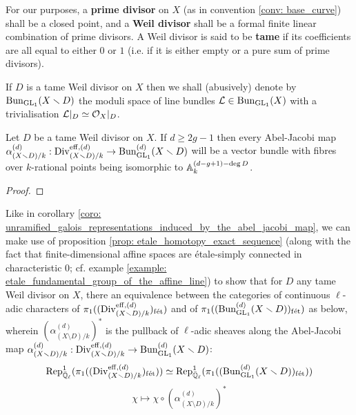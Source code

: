         \begin{definition} \label{def: prime_divisors_and_weil_divisors}
            For our purposes, a \textbf{prime divisor} on $X$ (as in convention \ref{conv: base_curve}) shall be a closed point, and a \textbf{Weil divisor} shall be a formal finite linear combination of prime divisors. A Weil divisor is said to be \textbf{tame} if its coefficients are all equal to either $0$ or $1$ (i.e. if it is either empty or a pure sum of prime divisors).
        \end{definition}
        \begin{convention} \label{conv: line_bundles_with_prescribed_trivialisations}
            If $D$ is a tame Weil divisor on $X$ then we shall (abusively) denote by $\mathrm{Bun}_{\operatorname{GL}_1}(X \smallsetminus D)$ the moduli space of line bundles $\mathcal{L} \in \mathrm{Bun}_{\operatorname{GL}_1}(X)$ with a trivialisation $\mathcal{L}|_D \simeq \mathcal{O}_X|_D$.
        \end{convention}
        \begin{proposition} \label{prop: the_tamely_ramified_abel_jacobi_map_is_a_vector_bundle}
            Let $D$ be a tame Weil divisor on $X$. If $d \geq 2g - 1$ then every Abel-Jacobi map $\alpha_{(X \smallsetminus D)/k}^{(d)}: \mathrm{Div}_{(X \smallsetminus D)/k}^{\mathrm{eff}, (d)} \to \mathrm{Bun}_{\operatorname{GL}_1}^{(d)}(X \smallsetminus D)$ will be a vector bundle with fibres over $k$-rational points being isomorphic to $\mathbb{A}^{(d - g + 1) - \deg D}_k$.
        \end{proposition}
            \begin{proof}
                
            \end{proof}
        \begin{corollary} \label{coro: tamely_ramified_galois_representations_induced_by_the_abel_jacobi_map}
            Like in corollary \ref{coro: unramified_galois_representations_induced_by_the_abel_jacobi_map}, we can make use of proposition \ref{prop: etale_homotopy_exact_sequence} (along with the fact that finite-dimensional affine spaces are \'etale-simply connected in characteristic $0$; cf. example \ref{example: etale_fundamental_group_of_the_affine_line}) to show that for $D$ any tame Weil divisor on $X$, there an equivalence between the categories of continuous $\ell$-adic characters of $\pi_1((\mathrm{Div}_{(X \smallsetminus D)/k}^{\mathrm{eff}, (d)})_{\mathrm{f\acute{e}t}})$ and of $\pi_1((\mathrm{Bun}_{\operatorname{GL}_1}^{(d)}(X \smallsetminus D))_{\mathrm{f\acute{e}t}})$ as below, wherein $(\alpha_{(X \setminus D)/k}^{(d)})^*$ is the pullback of $\ell$-adic sheaves along the Abel-Jacobi map $\alpha_{(X \smallsetminus D)/k}^{(d)}: \mathrm{Div}_{(X \smallsetminus D)/k}^{\mathrm{eff}, (d)} \to \mathrm{Bun}_{\operatorname{GL}_1}^{(d)}(X \smallsetminus D)$:
                $$\mathrm{Rep}^1_{\bar{\mathbb{Q}}_{\ell}}(\pi_1((\mathrm{Div}_{(X \smallsetminus D)/k}^{\mathrm{eff}, (d)})_{\mathrm{f\acute{e}t}})) \simeq \mathrm{Rep}^1_{\bar{\mathbb{Q}}_{\ell}}(\pi_1((\mathrm{Bun}_{\operatorname{GL}_1}^{(d)}(X \smallsetminus D))_{\mathrm{f\acute{e}t}}))$$
                $$\chi \mapsto \chi \circ (\alpha_{(X \setminus D)/k}^{(d)})^*$$
        \end{corollary}
    
